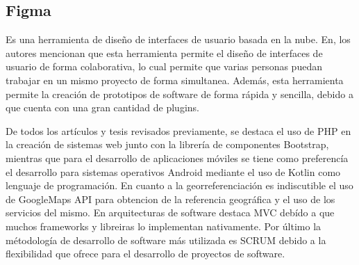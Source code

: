 \subsection{Figma}
Es una herramienta de diseño de interfaces de usuario basada en la nube. En\cite{figma}, los autores mencionan que esta herramienta permite el diseño de interfaces de usuario de forma colaborativa, lo cual permite que varias personas puedan trabajar en un mismo proyecto de forma simultanea. Además, esta herramienta permite la creación de prototipos de software de forma rápida y sencilla, debido a que cuenta con una gran cantidad de plugins.


\bigbreak
De todos los artículos y tesis revisados previamente, se destaca el uso de PHP en la creación de sistemas web junto con la librería de componentes Bootstrap, mientras que para el desarrollo de aplicaciones móviles se tiene como preferencía el desarrollo para sistemas operativos Android mediante el uso de Kotlin como lenguaje de programación. En cuanto a la georreferenciación es indiscutible el uso de GoogleMaps API para obtencion de la referencia geográfica y el uso de los servicios del mismo. En arquitecturas de software destaca MVC debído a que muchos frameworks y libreiras lo implementan nativamente. Por último la métodología de desarrollo de software más utilizada es SCRUM debido a la flexibilidad que ofrece para el desarrollo de proyectos de software.